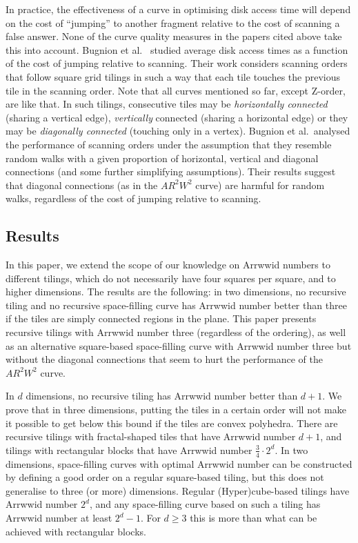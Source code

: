 \documentclass[11pt,a4paper]{article}
\newcommand{\ARRWW}{$AR^2W^2$\xspace}
\begin{document}
In practice, the effectiveness of a curve in optimising disk access time will depend on the cost of ``jumping'' to another fragment relative to the cost of scanning a false answer. None of the curve quality measures in the papers cited above take this into account. Bugnion et al.~\cite{Bugnion1997} studied average disk access times as a function of the cost of jumping relative to scanning. Their work considers scanning orders that follow square grid tilings in such a way that each tile touches the previous tile in the scanning order. Note that all curves mentioned so far, except Z-order, are like that. In such tilings, consecutive tiles may be \emph{horizontally connected} (sharing a vertical edge), \emph{vertically} connected (sharing a horizontal edge) or they may be \emph{diagonally connected} (touching only in a vertex). Bugnion et al.\ analysed the performance of scanning orders under the assumption that they resemble random walks with a given proportion of horizontal, vertical and diagonal connections (and some further simplifying assumptions). Their results suggest that diagonal connections (as in the \ARRWW curve) are harmful for random walks, regardless of the cost of jumping relative to scanning.

\subsection{Results}
In this paper, we extend the scope of our knowledge on Arrwwid numbers to different tilings, which do not necessarily have four squares per square, and to higher dimensions. The results are the following: in two dimensions, no recursive tiling and no recursive space-filling curve has Arrwwid number better than three if the tiles are simply connected regions in the plane. This paper presents recursive tilings with Arrwwid number three (regardless of the ordering), as well as an alternative square-based space-filling curve with Arrwwid number three but without the diagonal connections that seem to hurt the performance of the \ARRWW curve.

In $d$ dimensions, no recursive tiling has Arrwwid number better than $d+1$. We prove that in three dimensions, putting the tiles in a certain order will not make it possible to get below this bound if the tiles are convex polyhedra. There are recursive tilings with fractal-shaped tiles that have Arrwwid number $d+1$, and tilings with rectangular blocks that have Arrwwid number $\frac34 \cdot 2^d$. In two dimensions, space-filling curves with optimal Arrwwid number can be constructed by defining a good order on a regular square-based tiling, but this does not generalise to three (or more) dimensions. Regular (Hyper)cube-based tilings have Arrwwid number $2^d$, and any space-filling curve based on such a tiling has Arrwwid number at least $2^d - 1$. For $d \geq 3$ this is more than what can be achieved with rectangular blocks.
\end{document}
